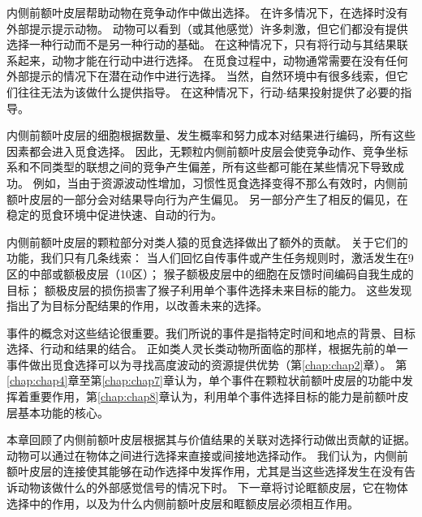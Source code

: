 内侧前额叶皮层帮助动物在竞争动作中做出选择。
在许多情况下，在选择时没有外部提示提示动物。
动物可以看到（或其他感觉）许多刺激，但它们都没有提供选择一种行动而不是另一种行动的基础。
在这种情况下，只有将行动与其结果联系起来，动物才能在行动中进行选择。
在觅食过程中，动物通常需要在没有任何外部提示的情况下在潜在动作中进行选择。
当然，自然环境中有很多线索，但它们往往无法为该做什么提供指导。
在这种情况下，行动-结果投射提供了必要的指导。\par


内侧前额叶皮层的细胞根据数量、发生概率和努力成本对结果进行编码，所有这些因素都会进入觅食选择。
因此，无颗粒内侧前额叶皮层会使竞争动作、竞争坐标系和不同类型的联想之间的竞争产生偏差，所有这些都可能在某些情况下导致成功。
例如，当由于资源波动性增加，习惯性觅食选择变得不那么有效时，内侧前额叶皮层的一部分会对结果导向行为产生偏见。
另一部分产生了相反的偏见，在稳定的觅食环境中促进快速、自动的行为。\par


内侧前额叶皮层的颗粒部分对类人猿的觅食选择做出了额外的贡献。
关于它们的功能，我们只有几条线索：
当人们回忆自传事件或产生任务规则时，激活发生在9区的中部或额极皮层（10区）；
猴子额极皮层中的细胞在反馈时间编码自我生成的目标；
额极皮层的损伤损害了猴子利用单个事件选择未来目标的能力。
这些发现指出了为目标分配结果的作用，以改善未来的选择\cite{tsujimoto2011frontal}。\par
事件的概念对这些结论很重要。我们所说的事件是指特定时间和地点的背景、目标选择、行动和结果的结合。
正如类人灵长类动物所面临的那样，根据先前的单一事件做出觅食选择可以为寻找高度波动的资源提供优势（第\ref{chap:chap2}章）。
第\ref{chap:chap4}章至第\ref{chap:chap7}章认为，单个事件在颗粒状前额叶皮层的功能中发挥着重要作用，第\ref{chap:chap8}章认为，利用单个事件选择目标的能力是前额叶皮层基本功能的核心。\par
本章回顾了内侧前额叶皮层根据其与价值结果的关联对选择行动做出贡献的证据。
动物可以通过在物体之间进行选择来直接或间接地选择动作。
我们认为，内侧前额叶皮层的连接使其能够在动作选择中发挥作用，尤其是当这些选择发生在没有告诉动物该做什么的外部感觉信号的情况下时。
下一章将讨论眶额皮层，它在物体选择中的作用，以及为什么内侧前额叶皮层和眶额皮层必须相互作用。\par



